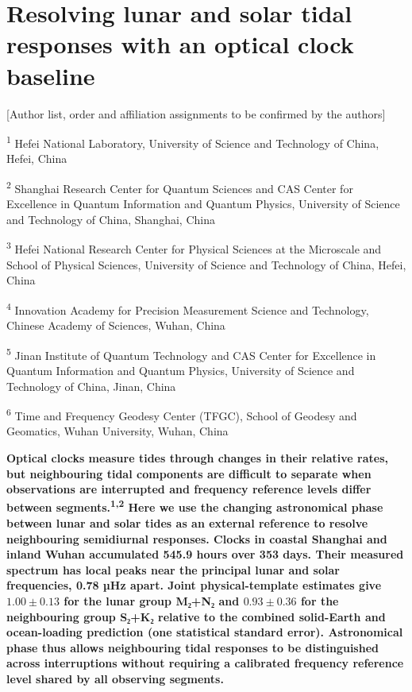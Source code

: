 \documentclass[
  12pt,
  a4paper,
]{article}
\author{}
\date{}
\begin{document}
\hypertarget{resolving-lunar-and-solar-tidal-responses-with-an-optical-clock-baseline}{%
\section{Resolving lunar and solar tidal responses with an optical clock
baseline}\label{resolving-lunar-and-solar-tidal-responses-with-an-optical-clock-baseline}}

\begingroup\singlespacing

{[}Author list, order and affiliation assignments to be confirmed by the
authors{]}

\textsuperscript{1} Hefei National Laboratory, University of Science and
Technology of China, Hefei, China

\textsuperscript{2} Shanghai Research Center for Quantum Sciences and
CAS Center for Excellence in Quantum Information and Quantum Physics,
University of Science and Technology of China, Shanghai, China

\textsuperscript{3} Hefei National Research Center for Physical Sciences
at the Microscale and School of Physical Sciences, University of Science
and Technology of China, Hefei, China

\textsuperscript{4} Innovation Academy for Precision Measurement Science
and Technology, Chinese Academy of Sciences, Wuhan, China

\textsuperscript{5} Jinan Institute of Quantum Technology and CAS Center
for Excellence in Quantum Information and Quantum Physics, University of
Science and Technology of China, Jinan, China

\textsuperscript{6} Time and Frequency Geodesy Center (TFGC), School of
Geodesy and Geomatics, Wuhan University, Wuhan, China

\endgroup

\textbf{Optical clocks measure tides through changes in their relative
rates, but neighbouring tidal components are difficult to separate when
observations are interrupted and frequency reference levels differ
between segments.\textsuperscript{1,2} Here we use the changing
astronomical phase between lunar and solar tides as an external
reference to resolve neighbouring semidiurnal responses. Clocks in
coastal Shanghai and inland Wuhan accumulated 545.9 hours over 353 days.
Their measured spectrum has local peaks near the principal lunar and
solar frequencies, 0.78 µHz apart. Joint physical-template estimates
give \(1.00\pm0.13\) for the lunar group M₂+N₂ and \(0.93\pm0.36\) for
the neighbouring group S₂+K₂ relative to the combined solid-Earth and
ocean-loading prediction (one statistical standard error). Astronomical
phase thus allows neighbouring tidal responses to be distinguished
across interruptions without requiring a calibrated frequency reference
level shared by all observing segments.}
\end{document}

